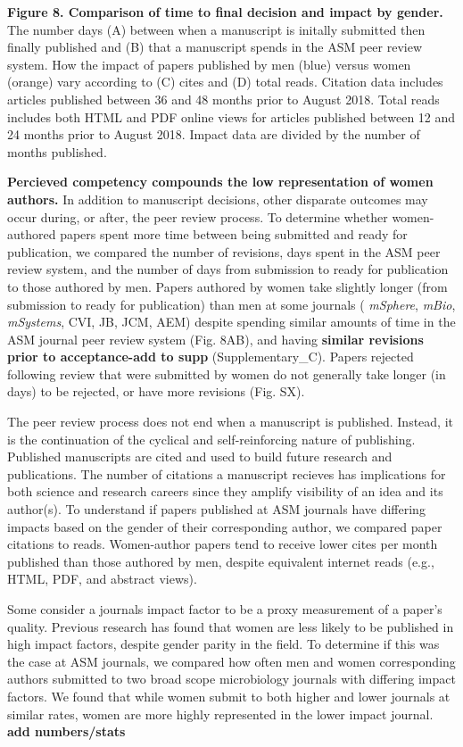 \documentclass[11pt,]{article}
\begin{document}
\textbf{Figure 8. Comparison of time to final decision and impact by
gender.} The number days (A) between when a manuscript is initally
submitted then finally published and (B) that a manuscript spends in the
ASM peer review system. How the impact of papers published by men (blue)
versus women (orange) vary according to (C) cites and (D) total reads.
Citation data includes articles published between 36 and 48 months prior
to August 2018. Total reads includes both HTML and PDF online views for
articles published between 12 and 24 months prior to August 2018. Impact
data are divided by the number of months published.

\textbf{Percieved competency compounds the low representation of women
authors.} In addition to manuscript decisions, other disparate outcomes
may occur during, or after, the peer review process. To determine
whether women-authored papers spent more time between being submitted
and ready for publication, we compared the number of revisions, days
spent in the ASM peer review system, and the number of days from
submission to ready for publication to those authored by men. Papers
authored by women take slightly longer (from submission to ready for
publication) than men at some journals ( \emph{mSphere}, \emph{mBio},
\emph{mSystems}, CVI, JB, JCM, AEM) despite spending similar amounts of
time in the ASM journal peer review system (Fig. 8AB), and having
\textbf{similar revisions prior to acceptance-add to supp}
(Supplementary\_C). Papers rejected following review that were submitted
by women do not generally take longer (in days) to be rejected, or have
more revisions (Fig. SX).

The peer review process does not end when a manuscript is published.
Instead, it is the continuation of the cyclical and self-reinforcing
nature of publishing. Published manuscripts are cited and used to build
future research and publications. The number of citations a manuscript
recieves has implications for both science and research careers since
they amplify visibility of an idea and its author(s). To understand if
papers published at ASM journals have differing impacts based on the
gender of their corresponding author, we compared paper citations to
reads. Women-author papers tend to receive lower cites per month
published than those authored by men, despite equivalent internet reads
(e.g., HTML, PDF, and abstract views).

Some consider a journals impact factor to be a proxy measurement of a
paper's quality. Previous research has found that women are less likely
to be published in high impact factors, despite gender parity in the
field. To determine if this was the case at ASM journals, we compared
how often men and women corresponding authors submitted to two broad
scope microbiology journals with differing impact factors. We found that
while women submit to both higher and lower journals at similar rates,
women are more highly represented in the lower impact journal.
\textbf{add numbers/stats}
\end{document}
